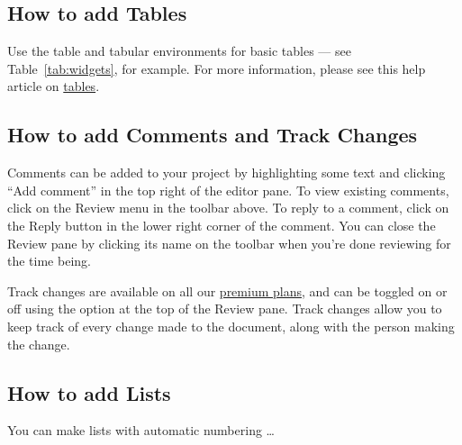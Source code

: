 \documentclass{article}
\begin{document}

\subsection{How to add Tables}

Use the table and tabular environments for basic tables --- see Table~\ref{tab:widgets}, for example. For more information, please see this help article on \href{https://www.overleaf.com/learn/latex/tables}{tables}. 


\subsection{How to add Comments and Track Changes}

Comments can be added to your project by highlighting some text and clicking ``Add comment'' in the top right of the editor pane. To view existing comments, click on the Review menu in the toolbar above. To reply to a comment, click on the Reply button in the lower right corner of the comment. You can close the Review pane by clicking its name on the toolbar when you're done reviewing for the time being.

Track changes are available on all our \href{https://www.overleaf.com/user/subscription/plans}{premium plans}, and can be toggled on or off using the option at the top of the Review pane. Track changes allow you to keep track of every change made to the document, along with the person making the change. 

\subsection{How to add Lists}

You can make lists with automatic numbering \dots
\end{document}
